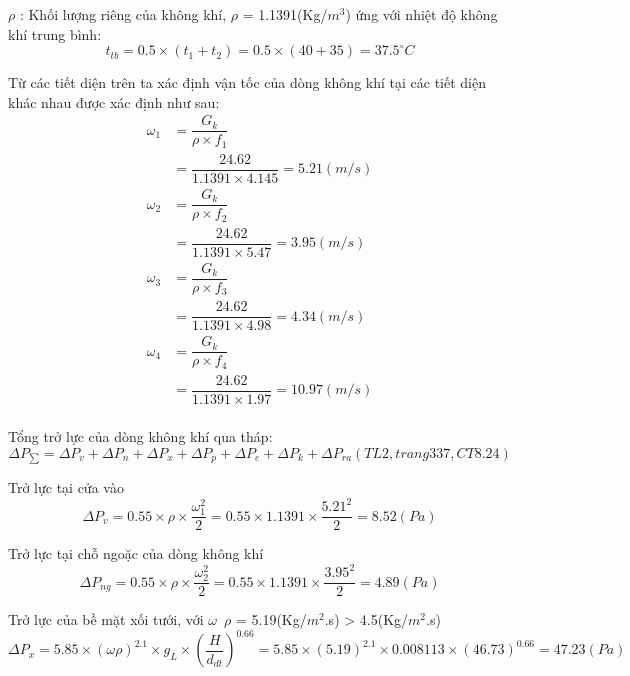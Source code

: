 $\rho$ : Khối lượng riêng của không khí, $\rho$ = 1.1391(Kg/$m^3$) ứng với nhiệt độ không khí trung bình:
\begin{equation}
	t_{tb} = 0.5 \times (t_{1} + t_{2}) = 0.5 \times (40 + 35) = 37.5^{\circ}C
\end{equation}

\newpage

Từ các tiết diện trên ta xác định vận tốc của dòng không khí tại các tiết diện khác nhau  được xác định như sau:
\begin{equation*}
	\begin{split}
		\omega_{1}& = \dfrac{G_{k}}{\rho \times f_{1}}\\ 
				  & = \dfrac{24.62}{1.1391 \times 4.145 } = 5.21(m/s)\\
		\omega_{2}& = \dfrac{G_{k}}{\rho \times f_{2}}\\ 
		& = \dfrac{24.62}{1.1391 \times 5.47 } = 3.95(m/s)\\
		\omega_{3}& = \dfrac{G_{k}}{\rho \times f_{3}}\\ 
		& = \dfrac{24.62}{1.1391 \times 4.98 } = 4.34(m/s)\\
		\omega_{4}& = \dfrac{G_{k}}{\rho \times f_{4}}\\ 
		& = \dfrac{24.62}{1.1391 \times 1.97 } = 10.97(m/s)\\
	\end{split}
\end{equation*}

Tổng trở lực của dòng không khí qua tháp:
\begin{equation*}
	\Delta P_{\sum} = \Delta P_{v} +\Delta P_{n} + \Delta P_{x} + \Delta P_{p} +\Delta P_{e} + \Delta P_{k} + \Delta P_{ra} (TL2, trang 337, CT 8.24)
\end{equation*}

Trở lực tại cửa vào
\begin{equation*}
	\Delta P_{v} = 0.55 \times \rho \times \dfrac{\omega_{1}^{2}}{2} = 0.55 \times 1.1391 \times \dfrac{5.21^2}{2} = 8.52(Pa)
\end{equation*}

Trở lực tại chỗ ngoặc của dòng không khí
\begin{equation*}
	\Delta P_{ng} = 0.55 \times \rho \times \dfrac{\omega_{2}^{2}}{2} = 0.55 \times 1.1391 \times \dfrac{3.95^2}{2} = 4.89(Pa)
\end{equation*}

Trở lực của bề mặt xối tưới, với $\omega$\ $\rho$ = 5.19(Kg/$m^2$.s) > 4.5(Kg/$m^2$.s)
\begin{equation*}
	\Delta P_{x} = 5.85 \times (\omega \rho)^{2.1}  \times g_{L} \times  (\dfrac{H}{d_{dt}})^{0.66} = 5.85 \times (5.19)^{2.1} \times 0.008113 \times (46.73)^{0.66} = 47.23(Pa)
\end{equation*}

